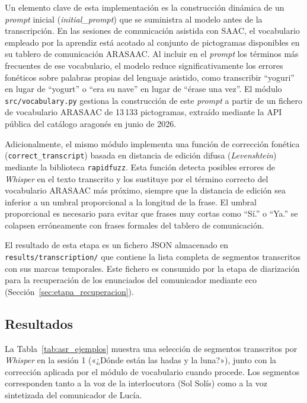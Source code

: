 Un elemento clave de esta implementación es la construcción dinámica de un
\emph{prompt} inicial (\emph{initial\_prompt}) que se suministra al modelo antes de la
transcripción. En las sesiones de comunicación asistida con \ac{SAAC}, el vocabulario
empleado por la aprendiz está acotado al conjunto de pictogramas disponibles en su
tablero de comunicación \ac{ARASAAC}. Al incluir en el \emph{prompt} los términos más
frecuentes de ese vocabulario, el modelo reduce significativamente los errores
fonéticos sobre palabras propias del lenguaje asistido, como transcribir ``yoguri'' en
lugar de ``yogurt'' o ``era su nave'' en lugar de ``érase una vez''. El módulo
\texttt{src/vocabulary.py} gestiona la construcción de este \emph{prompt} a partir de
un fichero de vocabulario \ac{ARASAAC} de 13\,133 pictogramas, extraído mediante la
\ac{API} pública del catálogo aragonés en junio de 2026.

Adicionalmente, el mismo módulo implementa una función de corrección fonética
(\texttt{correct\_transcript}) basada en distancia de edición difusa (\emph{Levenshtein})
mediante la biblioteca \texttt{rapidfuzz}. Esta función detecta posibles errores de
\emph{Whisper} en el texto transcrito y los sustituye por el término correcto del
vocabulario \ac{ARASAAC} más próximo, siempre que la distancia de edición sea inferior
a un umbral proporcional a la longitud de la frase. El umbral proporcional es
necesario para evitar que frases muy cortas como ``Sí.'' o ``Ya.'' se colapsen
erróneamente con frases formales del tablero de comunicación.

El resultado de esta etapa es un fichero \ac{JSON} almacenado en
\texttt{results/transcription/} que contiene la lista completa de segmentos
transcritos con sus marcas temporales. Este fichero es consumido por la etapa de
diarización para la recuperación de los enunciados del comunicador mediante eco
(Sección~\ref{sec:etapa_recuperacion}).


\subsection{Resultados}
\label{subsec:asr_resultados}

La Tabla~\ref{tab:asr_ejemplos} muestra una selección de segmentos transcritos por
\emph{Whisper} en la sesión 1 («¿Dónde están las hadas y la luna?»), junto con la
corrección aplicada por el módulo de vocabulario cuando procede. Los segmentos
corresponden tanto a la voz de la interlocutora (Sol Solís) como a la voz sintetizada
del comunicador de Lucía.

